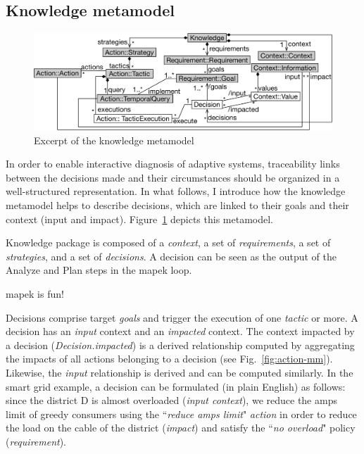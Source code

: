 \subsection{Knowledge metamodel}

\begin{figure}[t]
	\begin{center}
	\includegraphics[width=.9\linewidth]{img/chapt-tkm/mm/knowledge-mm}
	\caption{Excerpt of the knowledge metamodel}
	\label{fig:knowledge-mm}
	\end{center} 
\end{figure}

In order to enable interactive diagnosis of adaptive systems, traceability links between the decisions made and their circumstances should be organized in a well-structured representation. %
In what follows, I introduce how the knowledge \gls{metamodel} helps to describe decisions, which are linked to their  goals and their context (input and impact). 
Figure~\ref{fig:knowledge-mm} depicts this \gls{metamodel}.

Knowledge package is composed of a \textit{\gls{context}}, a set of \textit{\glspl{requirement}}, a set of \textit{strategies}, and a set of \textit{\glspl{decision}}.
A decision can be seen as the output of the Analyze and Plan steps in the \gls{mapek} loop.

\gls{mapek} is fun!

Decisions comprise target \textit{goals} and trigger the execution of one \textit{tactic} or more.  
A decision has an \textit{input} context and an \textit{impacted} context.
The context impacted by a decision  (\textit{Decision.impacted}) is a derived relationship computed by aggregating the impacts of all actions belonging to a decision (see Fig.~\ref{fig:action-mm}).
Likewise, the \textit{input} relationship is derived and can be computed similarly. 
In the smart grid example, a decision can be formulated (in plain English) as follows: since the district D is almost overloaded (\textit{input context}), we reduce the amps limit of greedy consumers using the ``\textit{reduce amps limit}" \textit{action} in order to reduce the load on the cable of the district (\textit{impact}) and satisfy the ``\textit{no overload}" policy (\textit{requirement}).

